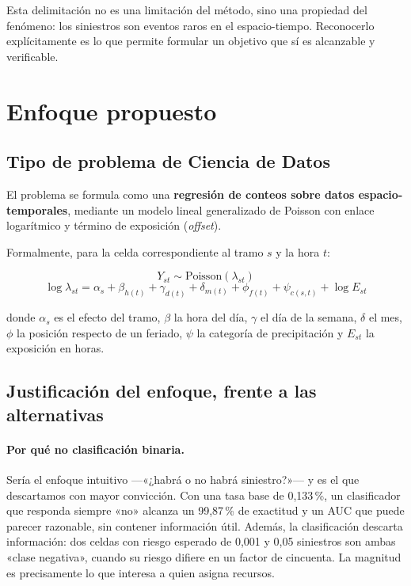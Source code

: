 \documentclass[11pt,a4paper]{article}
\begin{document}
\medskip
Esta delimitación no es una limitación del método, sino una propiedad del
fenómeno: los siniestros son eventos raros en el espacio-tiempo. Reconocerlo
explícitamente es lo que permite formular un objetivo que sí es alcanzable y
verificable.

\section{Enfoque propuesto}
\label{sec:enfoque}

\subsection{Tipo de problema de Ciencia de Datos}

El problema se formula como una \textbf{regresión de conteos sobre datos
espacio-temporales}, mediante un modelo lineal generalizado de Poisson con
enlace logarítmico y término de exposición (\emph{offset}).

Formalmente, para la celda correspondiente al tramo $s$ y la hora $t$:

\begin{equation*}
Y_{st} \sim \mathrm{Poisson}(\lambda_{st})
\end{equation*}
\begin{equation*}
\log \lambda_{st} = \alpha_s + \beta_{h(t)} + \gamma_{d(t)} + \delta_{m(t)}
+ \phi_{f(t)} + \psi_{c(s,t)} + \log E_{st}
\end{equation*}

donde $\alpha_s$ es el efecto del tramo, $\beta$ la hora del día, $\gamma$ el
día de la semana, $\delta$ el mes, $\phi$ la posición respecto de un feriado,
$\psi$ la categoría de precipitación y $E_{st}$ la exposición en horas.

\subsection{Justificación del enfoque, frente a las alternativas}

\paragraph{Por qué no clasificación binaria.} Sería el enfoque intuitivo
---«¿habrá o no habrá siniestro?»--- y es el que descartamos con mayor
convicción. Con una tasa base de 0,133\,\%, un clasificador que responda siempre
«no» alcanza un 99,87\,\% de exactitud y un AUC que puede parecer razonable, sin
contener información útil. Además, la clasificación descarta información: dos
celdas con riesgo esperado de 0,001 y 0,05 siniestros son ambas «clase
negativa», cuando su riesgo difiere en un factor de cincuenta. La magnitud es
precisamente lo que interesa a quien asigna recursos.
\end{document}
